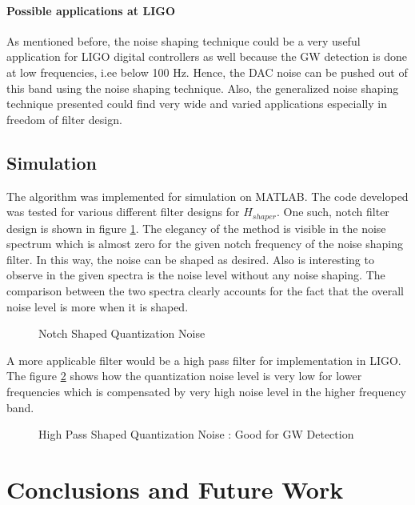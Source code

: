 \documentclass[colorlinks=true,pdfstartview=FitV,linkcolor=blue,
            citecolor=red,urlcolor=magenta]{ligodoc}
\begin{document}
    		\paragraph{Possible applications at LIGO} As mentioned before, the noise shaping technique could be a very useful application for LIGO digital controllers as well because the GW detection is done at low frequencies, i.ee below 100 Hz. Hence, the DAC noise can be pushed out of this band using the noise shaping technique. Also, the generalized noise shaping technique presented could find very wide and varied applications especially in freedom of filter design.
	\subsection{Simulation} The algorithm was implemented for simulation on MATLAB. The code developed was tested for various different filter designs for $H_{shaper}$. One such, notch filter design is shown in figure \ref{notch}. The elegancy of the method is visible in the noise spectrum which is almost zero for the given notch frequency of the noise shaping filter. In this way, the noise can be shaped as desired. Also is interesting to observe in the given spectra is the noise level without any noise shaping. The comparison between the two spectra clearly accounts for the fact that the overall noise level is more when it is shaped. 
	\begin{figure}[H]

  		\centering
  		
%  		
  		\caption{Notch Shaped Quantization Noise}
		\label{notch}
	\end{figure}
	A more applicable filter would be a high pass filter for implementation in LIGO. The figure \ref{highp} shows how the quantization noise level is very low for lower frequencies which is compensated by very high noise level in the higher frequency band. 
	\begin{figure}[H]

  		\centering
  		
%  		
  		\caption{High Pass Shaped Quantization Noise : Good for GW Detection}
		\label{highp}
	\end{figure}
 

\section{Conclusions and Future Work}
\end{document}
